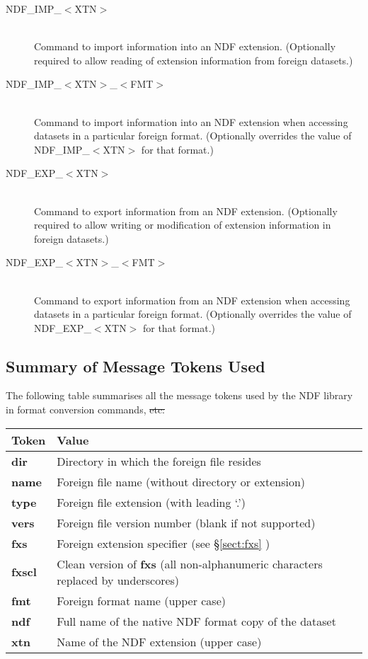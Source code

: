 \begin{description}
\item[NDF\_IMP\_$<$XTN$>$]\mbox{}\\
Command to import information into an NDF extension. (Optionally
required to allow reading of extension information from foreign
datasets.)

\item[NDF\_IMP\_$<$XTN$>$\_$<$FMT$>$]\mbox{}\\
Command to import information into an NDF extension when accessing
datasets in a particular foreign format. (Optionally overrides the
value of NDF\_IMP\_$<$XTN$>$ for that format.)

\item[NDF\_EXP\_$<$XTN$>$]\mbox{}\\
Command to export information from an NDF extension. (Optionally
required to allow writing or modification of extension information in
foreign datasets.)

\item[NDF\_EXP\_$<$XTN$>$\_$<$FMT$>$]\mbox{}\\
Command to export information from an NDF extension when accessing
datasets in a particular foreign format. (Optionally overrides the
value of NDF\_EXP\_$<$XTN$>$ for that format.)

\end{description}

\subsection{Summary of Message Tokens Used}

The following table summarises all the message tokens used by the NDF
library in format conversion commands, \st{etc:}

\begin{center}
\begin{tabular}{|l|l|}
\hline
{\bf Token} & {\bf Value}\\
\hline\hline
{\bf dir}  & Directory in which the foreign file resides\\
{\bf name} & Foreign file name (without directory or extension)\\
{\bf type} & Foreign file extension (with leading `.')\\
{\bf vers} & Foreign file version number (blank if not supported)\\
{\bf fxs}  & Foreign extension specifier (see \S\ref{sect:fxs} )\\
{\bf fxscl} & Clean version of {\bf fxs} (all non-alphanumeric characters
replaced by underscores)\\
{\bf fmt}  & Foreign format name (upper case)\\
{\bf ndf}  & Full name of the native NDF format copy of the dataset\\
{\bf xtn}  & Name of the NDF extension (upper case)\\
\hline
\end{tabular}
\end{center}

